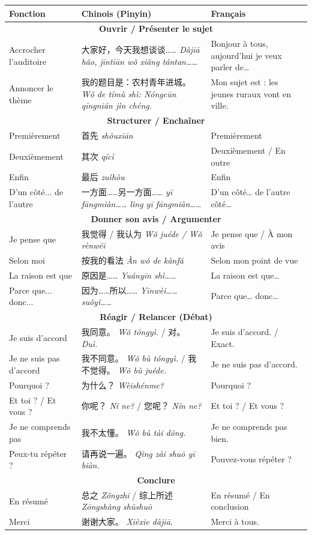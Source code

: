 \documentclass[11pt]{article}
\begin{document}
\begin{center}
\begin{tabularx}{\linewidth}{|X|X|X|}
\hline
\rowcolor{popblueL} Fonction & Chinois (Pinyin) & Français \\
\hline
\multicolumn{3}{|c|}{\textbf{Ouvrir / Présenter le sujet}} \\ \hline
Accrocher l'auditoire & 大家好，今天我想谈谈…… \emph{Dàjiā hǎo, jīntiān wǒ xiǎng tántan……} & Bonjour à tous, aujourd'hui je veux parler de… \\
Annoncer le thème & 我的题目是：农村青年进城。 \emph{Wǒ de tímù shì: Nóngcūn qīngnián jìn chéng.} & Mon sujet est : les jeunes ruraux vont en ville. \\
\hline
\multicolumn{3}{|c|}{\textbf{Structurer / Enchaîner}} \\ \hline
Premièrement & 首先 \emph{shǒuxiān} & Premièrement \\
Deuxièmement & 其次 \emph{qícì} & Deuxièmement / En outre \\
Enfin & 最后 \emph{zuìhòu} & Enfin \\
D'un côté... de l'autre & 一方面……另一方面…… \emph{yī fāngmiàn…… lìng yī fāngmiàn……} & D'un côté… de l'autre côté… \\
\hline
\multicolumn{3}{|c|}{\textbf{Donner son avis / Argumenter}} \\ \hline
Je pense que & 我觉得 / 我认为 \emph{Wǒ juéde / Wǒ rènwéi} & Je pense que / À mon avis \\
Selon moi & 按我的看法 \emph{Àn wǒ de kànfǎ} & Selon mon point de vue \\
La raison est que & 原因是…… \emph{Yuányīn shì……} & La raison est que… \\
Parce que... donc... & 因为……所以…… \emph{Yīnwèi…… suǒyǐ……} & Parce que… donc… \\
\hline
\multicolumn{3}{|c|}{\textbf{Réagir / Relancer (Débat)}} \\ \hline
Je suis d'accord & 我同意。 \emph{Wǒ tóngyì.} / 对。 \emph{Duì.} & Je suis d'accord. / Exact. \\
Je ne suis pas d'accord & 我不同意。 \emph{Wǒ bù tóngyì.} / 我不觉得。 \emph{Wǒ bù juéde.} & Je ne suis pas d'accord. \\
Pourquoi ? & 为什么？ \emph{Wèishénme?} & Pourquoi ? \\
Et toi ? / Et vous ? & 你呢？ \emph{Nǐ ne?} / 您呢？ \emph{Nín ne?} & Et toi ? / Et vous ? \\
Je ne comprends pas & 我不太懂。 \emph{Wǒ bù tài dǒng.} & Je ne comprends pas bien. \\
Peux-tu répéter ? & 请再说一遍。 \emph{Qǐng zài shuō yī biàn.} & Pouvez-vous répéter ? \\
\hline
\multicolumn{3}{|c|}{\textbf{Conclure}} \\ \hline
En résumé & 总之 \emph{Zǒngzhī} / 综上所述 \emph{Zōngshàng shùshuō} & En résumé / En conclusion \\
Merci & 谢谢大家。 \emph{Xièxie dàjiā.} & Merci à tous. \\
\hline
\end{tabularx}
\end{center}
\end{document}
